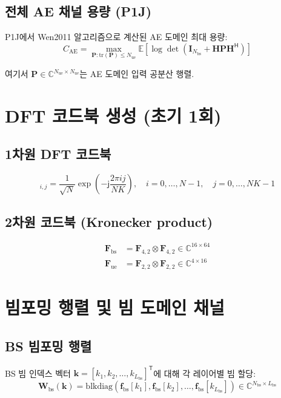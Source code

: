 \documentclass[10pt]{article}
\begin{document}
\subsection{전체 AE 채널 용량 (P1J)}
P1J에서 Wen2011 알고리즘으로 계산된 AE 도메인 최대 용량:
\begin{equation}
C_{\text{AE}} = \max_{\mathbf{P}: \text{tr}(\mathbf{P}) \leq N_{\text{ue}}} \mathbb{E}\left[\log \det\left(\mathbf{I}_{N_{\text{bs}}} + \mathbf{H} \mathbf{P} \mathbf{H}^{\mathsf{H}}\right)\right]
\end{equation}

여기서 $\mathbf{P} \in \mathbb{C}^{N_{\text{ue}} \times N_{\text{ue}}}$는 AE 도메인 입력 공분산 행렬.

\section{DFT 코드북 생성 (초기 1회)}

\subsection{1차원 DFT 코드북}
\begin{equation}
[\mathbf{F}_{N,K}]_{i,j} = \frac{1}{\sqrt{N}} \exp\left(-\mathsf{j}\frac{2\pi ij}{NK}\right), \quad i = 0, \ldots, N-1, \quad j = 0, \ldots, NK-1
\end{equation}

\subsection{2차원 코드북 (Kronecker product)}
\begin{align}
\mathbf{F}_{\text{bs}} &= \mathbf{F}_{4,2} \otimes \mathbf{F}_{4,2} \in \mathbb{C}^{16 \times 64} \\
\mathbf{F}_{\text{ue}} &= \mathbf{F}_{2,2} \otimes \mathbf{F}_{2,2} \in \mathbb{C}^{4 \times 16}
\end{align}

\newpage
\section{빔포밍 행렬 및 빔 도메인 채널}

\subsection{BS 빔포밍 행렬}
BS 빔 인덱스 벡터 $\boldsymbol{k} = [k_1, k_2, \ldots, k_{L_{\text{bs}}}]^{\mathsf{T}}$에 대해 각 레이어별 빔 할당:
\begin{equation}
\mathbf{W}_{\text{bs}}(\boldsymbol{k}) = \text{blkdiag}\left(\mathbf{f}_{\text{bs}}[k_1], \mathbf{f}_{\text{bs}}[k_2], \ldots, \mathbf{f}_{\text{bs}}[k_{L_{\text{bs}}}]\right) \in \mathbb{C}^{N_{\text{bs}} \times L_{\text{bs}}}
\end{equation}
\end{document}
